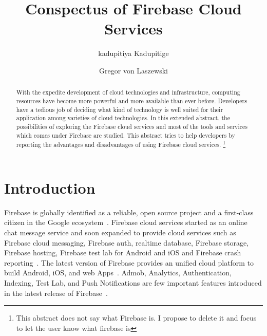 
\title{Conspectus of Firebase Cloud Services}


\author{kadupitiya Kadupitige}

\author{Gregor von Laszewski}


\renewcommand{\shortauthors}{G. v. Laszewski}


\begin{abstract}
With the expedite development of cloud technologies and infrastructure,
computing resources have become more powerful and more available than ever
before. Developers have a tedious job of deciding what kind of technology is
well suited for their application among varieties of cloud technologies. In this
extended abstract, the possibilities of exploring the Firebase cloud services and most of
the tools and services which comes under Firebase are studied. This abstract tries
to help developers by reporting the advantages and disadvantages of using
Firebase cloud services.
\footnote{This abstract does not say what Firebase is. I propose to delete it and focus to let the user know what firebase is}
\end{abstract}



\maketitle


\section{Introduction}

Firebase is globally identified as a reliable, open source project and a
first-class citizen in the Google ecosystem~\cite{hid-sp18-409-www-firebase}.
Firebase cloud services started as an online chat message service and soon
expanded to provide cloud services such as Firebase cloud messaging, Firebase
auth, realtime database, Firebase storage, Firebase hosting, Firebase test lab
for Android and iOS and Firebase crash
reporting~\cite{hid-sp18-409-www-firebase-official}. The latest version of
Firebase provides an unified cloud platform to build Android, iOS, and web
Apps~\cite{hid-sp18-409-www-firebase-official}.  Admob, Analytics,
Authentication, Indexing, Test Lab, and Push Notifications are few important
features introduced in the latest release of
Firebase~\cite{hid-sp18-409-www-firebase-official}.


